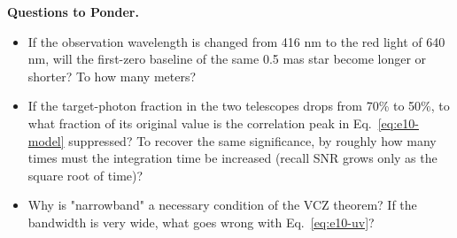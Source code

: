 \medskip
\noindent\textbf{Questions to Ponder.}
\begin{itemize}
  \item If the observation wavelength is changed from 416 nm to the red light of 640 nm, will the first-zero baseline of the same 0.5 mas star become longer or shorter? To how many meters?
  \item If the target-photon fraction in the two telescopes drops from 70\% to 50\%, to what fraction of its original value is the correlation peak in Eq.~\eqref{eq:e10-model} suppressed? To recover the same significance, by roughly how many times must the integration time be increased (recall SNR grows only as the square root of time)?
  \item Why is "narrowband" a necessary condition of the VCZ theorem? If the bandwidth is very wide, what goes wrong with Eq.~\eqref{eq:e10-uv}?
\end{itemize}
